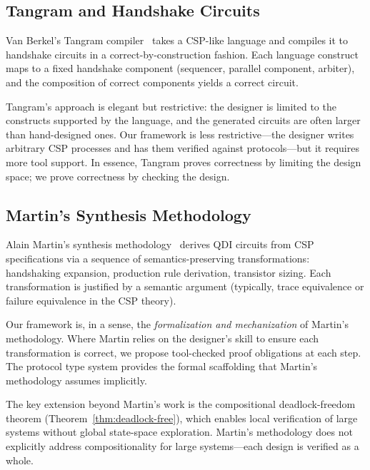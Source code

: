 \documentclass[11pt]{article}
\begin{document}
\subsection{Tangram and Handshake Circuits}

Van Berkel's Tangram compiler~\cite{vanberkel1993} takes a CSP-like
language and compiles it to handshake circuits in a
correct-by-construction fashion.  Each language construct maps to a
fixed handshake component (sequencer, parallel component, arbiter),
and the composition of correct components yields a correct circuit.

Tangram's approach is elegant but restrictive: the designer is
limited to the constructs supported by the language, and the
generated circuits are often larger than hand-designed ones.  Our
framework is less restrictive---the designer writes arbitrary CSP
processes and has them verified against protocols---but it requires
more tool support.  In essence, Tangram proves correctness by
limiting the design space; we prove correctness by checking the
design.

\subsection{Martin's Synthesis Methodology}

Alain Martin's synthesis methodology~\cite{martin1990} derives QDI
circuits from CSP specifications via a sequence of
semantics-preserving transformations: handshaking expansion,
production rule derivation, transistor sizing.  Each transformation
is justified by a semantic argument (typically, trace equivalence or
failure equivalence in the CSP theory).

Our framework is, in a sense, the \emph{formalization and
mechanization} of Martin's methodology.  Where Martin relies on the
designer's skill to ensure each transformation is correct, we propose
tool-checked proof obligations at each step.  The protocol type system
provides the formal scaffolding that Martin's methodology assumes
implicitly.

The key extension beyond Martin's work is the compositional
deadlock-freedom theorem (Theorem~\ref{thm:deadlock-free}), which
enables local verification of large systems without global
state-space exploration.  Martin's methodology does not explicitly
address compositionality for large systems---each design is verified
as a whole.
\end{document}

